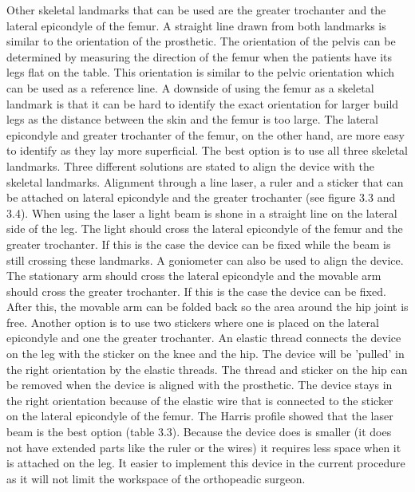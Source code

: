 \documentclass[whitelogo]{tudelft-report}
\begin{document}
{{{Other skeletal landmarks that can be used are the greater trochanter and the lateral epicondyle of the femur. A straight line drawn from both landmarks is similar to the orientation of the prosthetic. The orientation of the pelvis can be determined by measuring the direction of the femur when the patients have its legs flat on the table. This orientation is similar to the pelvic orientation which can be used as a reference line. A downside of using the femur as a skeletal landmark is that it can be hard to identify the exact orientation for larger build legs as the distance between the skin and the femur is too large. The lateral epicondyle and greater trochanter of the femur, on the other hand, are more easy to identify as they lay more superficial. The best option is to use all three skeletal landmarks.
\newline
\newline
Three different solutions are stated to align the device with the skeletal landmarks. Alignment through a line laser, a ruler and a sticker that can be attached on lateral epicondyle and the greater trochanter (see figure 3.3 and 3.4). When using the laser a light beam is shone in a straight line on the lateral side of the leg. The light should cross the lateral epicondyle of the femur and the greater trochanter. If this is the case the device can be fixed while the beam is still crossing these landmarks. A goniometer can also be used to align the device. The stationary arm should cross the lateral epicondyle and the movable arm should cross the greater trochanter. If this is the case the device can be fixed. After this, the movable arm can be folded back so the area around the hip joint is free. Another option is to use two stickers where one is placed on the lateral epicondyle and one the greater trochanter. An elastic thread connects the device on the leg with the sticker on the knee and the hip. The device will be 'pulled' in the right orientation by the elastic threads. The thread and sticker on the hip can be removed when the device is aligned with the prosthetic. The device stays in the right orientation because of the elastic wire that is connected to the sticker on the lateral epicondyle of the femur. The Harris profile showed that the laser beam is the best option (table 3.3). Because the device does is smaller (it does not have extended parts like the ruler or the wires) it requires less space when it is attached on the leg. It easier to implement this device in the current procedure as it will not limit the workspace of the orthopeadic surgeon.
}}}
\end{document}
